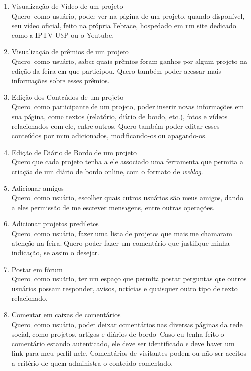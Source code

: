 \begin{enumerate}
      \item Visualização de Vídeo de um projeto \\
        Quero, como usuário, poder ver na página de um projeto, quando disponível, seu vídeo oficial, feito na própria Febrace, hospedado em um site dedicado como a IPTV-USP ou o Youtube.
      \item Visualização de prêmios de um projeto \\
        Quero, como usuário, saber quais prêmios foram ganhos por algum projeto na edição da feira em que participou. Quero também poder acessar mais informações sobre esses prêmios.
      \item Edição dos Conteúdos de um projeto \\
        Quero, como participante de um projeto, poder inserir novas informações em sua página, como textos (relatório, diário de bordo, etc.), fotos e vídeos relacionados com ele, entre outros. Quero também poder editar esses conteúdos por mim adicionados, modificando-os ou apagando-os.
      \item Edição de Diário de Bordo de um projeto \\
        Quero que cada projeto tenha a ele associado uma ferramenta que permita a criação de um diário de bordo online, com o formato de \textit{weblog}.
      \item Adicionar amigos \\
        Quero, como usuário, escolher quais outros usuários são meus amigos, dando a eles permissão de me escrever mensagens, entre outras operações.
      \item Adicionar projetos prediletos \\
        Quero, como usuário, fazer uma lista de projetos que mais me chamaram atenção na feira. Quero poder fazer um comentário que justifique minha indicação, se assim o desejar.
      \item Postar em fórum \\
        Quero, como usuário, ter um espaço que permita postar perguntas que outros usuários possam responder, avisos, notícias e quaisquer outro tipo de texto relacionado.
      \item Comentar em caixas de comentários \\
        Quero, como usuário, poder deixar comentários nas diversas páginas da rede social, como projetos, artigos e diários de bordo. Caso eu tenha feito o comentário estando autenticado, ele deve ser identificado e deve haver um link para meu perfil nele. Comentários de visitantes podem ou não ser aceitos a critério de quem administra o conteúdo comentado.

\end{enumerate}
